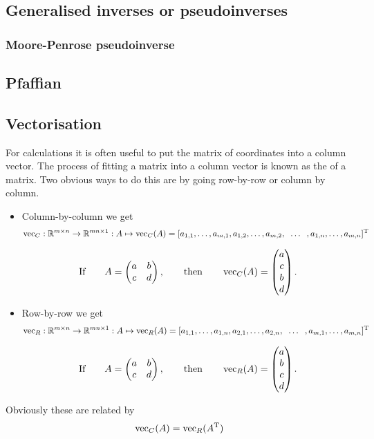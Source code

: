 \subsection{Generalised inverses or pseudoinverses}
\subsubsection{Moore-Penrose pseudoinverse}

\subsection{Pfaffian}

\subsection{Vectorisation}
For calculations it is often useful to put the matrix of coordinates into a column vector. The process of fitting a matrix into a column vector is known as the  of a matrix. Two obvious ways to do this are by going row-by-row or column by column.
\begin{itemize}
\item Column-by-column we get
\[ \operatorname{vec}_C: \mathbb{R}^{m\times n}\to \mathbb{R}^{mn\times 1}: A \mapsto \operatorname{vec}_C(A) = [a_{1,1},\ldots,a_{m,1}, a_{1,2},\ldots, a_{m,2}, \;\; \ldots \;\; , a_{1,n}, \ldots, a_{m,n}]^{\mathrm{T}} \]
\begin{example}
\[ \text{If} \qquad A = \begin{pmatrix}
a & b \\ c & d
\end{pmatrix}, \qquad \text{then} \qquad \operatorname{vec}_C(A) = \begin{pmatrix}
a \\ c \\ b \\ d
\end{pmatrix}. \]
\end{example}
\item Row-by-row we get
\[ \operatorname{vec}_R: \mathbb{R}^{m\times n}\to \mathbb{R}^{mn\times 1}: A \mapsto \operatorname{vec}_R(A) = [a_{1,1},\ldots,a_{1,n}, a_{2,1},\ldots, a_{2,n}, \;\; \ldots \;\; , a_{m,1}, \ldots, a_{m,n}]^{\mathrm{T}} \]
\begin{example}
\[ \text{If} \qquad A = \begin{pmatrix}
a & b \\ c & d
\end{pmatrix}, \qquad \text{then} \qquad \operatorname{vec}_R(A) = \begin{pmatrix}
a \\ b \\ c \\ d
\end{pmatrix}. \]
\end{example}
\end{itemize}
Obviously these are related by
\[ \operatorname{vec}_C(A) = \operatorname{vec}_R(A^{\mathrm{T}}) \]

